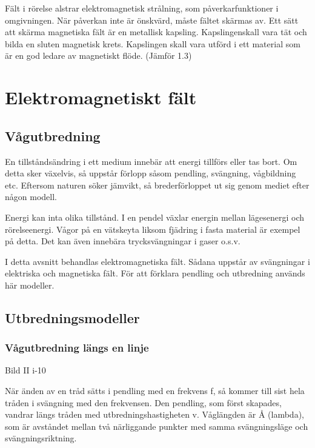 \documentclass[a4paper,twoside,twocolumn,openright]{book}
\begin{document}
Fält i rörelse alstrar elektromagnetisk strålning, som påverkarfunktioner i omgivningen.
När påverkan inte är önskvärd, måste fältet skärmas av. Ett sätt att skärma magnetiska
fält är en metallisk kapsling. Kapslingenskall vara tät och bilda en sluten magnetisk
krets. Kapslingen skall vara utförd i ett material som är en god ledare av magnetiskt
flöde.
(Jämför 1.3)

\cleardoublepage

\section{Elektromagnetiskt fält}

\subsection{Vågutbredning}

En tillståndsändring i ett medium innebär att energi tillförs eller tas bort. Om detta
sker växelvis, så uppstår förlopp såsom pendling, svängning, vågbildning etc.
Eftersom naturen söker jämvikt, så brederförloppet ut sig genom mediet efter någon modell.

Energi kan inta olika tillstånd. I en pendel växlar energin mellan lägesenergi och
rörelseenergi. Vågor på en vätskeyta liksom fjädring i fasta material är exempel på
detta. Det kan även innebära trycksvängningar i gaser o.s.v.

I detta avsnitt behandlas elektromagnetiska fält. Sådana uppstår av svängningar i
elektriska och magnetiska fält. För att förklara pendling och utbredning används här
modeller.

\subsection{Utbredningsmodeller}

\subsubsection{Vågutbredning längs en linje}

Bild II i-10

När änden av en tråd sätts i pendling med en frekvens f, så kommer till sist hela tråden i
svängning med den frekvensen. Den pendling, som först skapades, vandrar längs tråden med
utbredningshastigheten v. Våglängden är Å (lambda), som är avståndet mellan två
närliggande punkter med samma svängningsläge och svängningsriktning.
\end{document}
